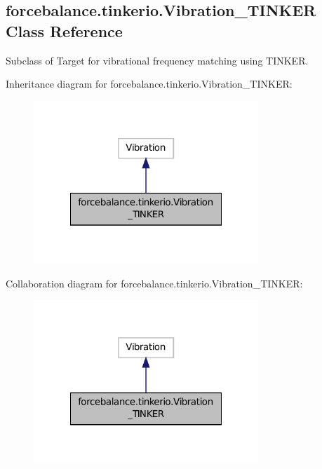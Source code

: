 \hypertarget{classforcebalance_1_1tinkerio_1_1Vibration__TINKER}{\subsection{forcebalance.\-tinkerio.\-Vibration\-\_\-\-T\-I\-N\-K\-E\-R Class Reference}
\label{classforcebalance_1_1tinkerio_1_1Vibration__TINKER}
}


Subclass of Target for vibrational frequency matching using T\-I\-N\-K\-E\-R.  




Inheritance diagram for forcebalance.\-tinkerio.\-Vibration\-\_\-\-T\-I\-N\-K\-E\-R\-:\nopagebreak
\begin{figure}[H]
\begin{center}
\leavevmode
\includegraphics[width=240pt]{classforcebalance_1_1tinkerio_1_1Vibration__TINKER__inherit__graph}
\end{center}
\end{figure}


Collaboration diagram for forcebalance.\-tinkerio.\-Vibration\-\_\-\-T\-I\-N\-K\-E\-R\-:\nopagebreak
\begin{figure}[H]
\begin{center}
\leavevmode
\includegraphics[width=240pt]{classforcebalance_1_1tinkerio_1_1Vibration__TINKER__coll__graph}
\end{center}
\end{figure}
